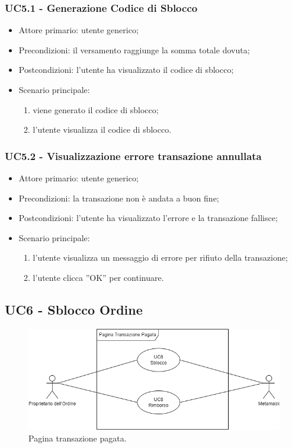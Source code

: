 \subsubsection{UC5.1 - Generazione Codice di Sblocco}

\begin{itemize}
    \item Attore primario: utente generico;
    \item Precondizioni: il versamento raggiunge la somma totale dovuta;
    \item Postcondizioni: l'utente ha visualizzato il codice di sblocco;
    \item Scenario principale:
    \begin{enumerate}
        \item viene generato il codice di sblocco;
        \item l'utente visualizza il codice di sblocco.
    \end{enumerate}
\end{itemize}

\subsubsection{UC5.2 - Visualizzazione errore transazione annullata}

\begin{itemize}
    \item Attore primario: utente generico;
    \item Precondizioni: la transazione non è andata a buon fine;
    \item Postcondizioni: l'utente ha visualizzato l'errore e la transazione fallisce;
    \item Scenario principale:
    \begin{enumerate}
        \item l'utente visualizza un messaggio di errore per rifiuto della transazione;
        \item l'utente clicca ”OK” per continuare.
    \end{enumerate}
\end{itemize}

\subsection{UC6 - Sblocco Ordine}

\begin{figure}[H]
    \centering
    \includegraphics[scale=0.7]{immagini/UseCases-UC6.png}
    \caption{Pagina transazione pagata.}
  \end{figure}

